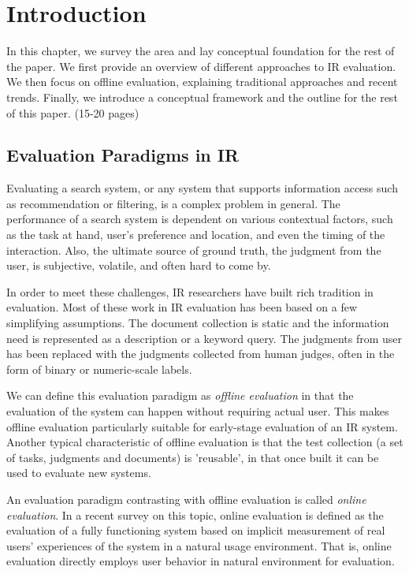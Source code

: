 \documentclass[openany]{now} %
\begin{document}
\chapter{Introduction}
\label{c-intro}

In this chapter, we survey the area and lay conceptual foundation for the rest of the paper. We first provide an overview of different approaches to IR evaluation. We then focus on offline evaluation, explaining traditional approaches and recent trends. Finally, we introduce a conceptual framework and the outline for the rest of this paper. (15-20 pages)

\section{Evaluation Paradigms in IR}

Evaluating a search system, or any system that supports information access such as recommendation or filtering, is a complex problem in general. The performance of a search system is dependent on various contextual factors, such as the task at hand, user's preference and location, and even the timing of the interaction. Also, the ultimate source of ground truth, the judgment from the user, is subjective, volatile, and often hard to come by.

In order to meet these challenges, IR researchers have built rich tradition in evaluation. Most of these work in IR evaluation has been based on a few simplifying assumptions. The document collection is static and the information need is represented as a description or a keyword query. The judgments from user has been replaced with the judgments collected from human judges, often in the form of binary or numeric-scale labels.

We can define this evaluation paradigm as \textit{offline evaluation} \cite{INR-009} in that the evaluation of the system can happen without requiring actual user. This makes offline evaluation particularly suitable for early-stage evaluation of an IR system. Another typical characteristic of offline evaluation is that the test collection (a set of tasks, judgments and documents) is 'reusable', in that once built it can be used to evaluate new systems.

An evaluation paradigm contrasting with offline evaluation is called \textit{online evaluation}. In a recent survey \cite{INR-XYZ} on this topic, online evaluation is defined as the evaluation of a fully functioning system based on implicit measurement of real users' experiences of the system in a natural usage environment. That is, online evaluation directly employs user behavior in natural environment for evaluation.
\end{document}
